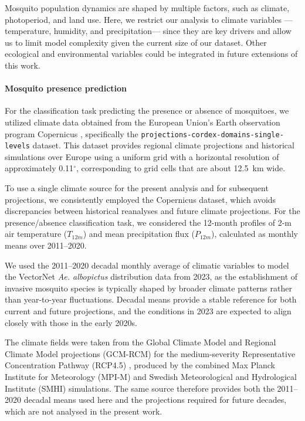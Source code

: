 \documentclass[preprint,12pt]{elsarticle}
\begin{document}
Mosquito population dynamics are shaped by multiple factors, such as climate, photoperiod, and land use. Here, we restrict our analysis to climate variables —temperature, humidity, and precipitation— since they are key drivers \cite{zardini2024, Steindorf2025} and allow us to limit model complexity given the current size of our dataset. Other ecological and environmental variables could be integrated in future extensions of this work.

\paragraph{Mosquito presence prediction}

For the classification task predicting the presence or absence of mosquitoes, we utilized climate data obtained from the European Union's Earth observation program Copernicus \cite{copernicus_2025}, specifically the \texttt{projections-cordex-domains-single-levels} dataset. 
This dataset provides regional climate projections and historical simulations over Europe using a uniform grid with a horizontal resolution of approximately 0.11$^\circ$, corresponding to grid cells that are about 12.5~km wide.

To use a single climate source for the present analysis and for subsequent projections, we consistently employed the Copernicus dataset, which avoids discrepancies between historical reanalyses and future climate projections. For the presence/absence classification task, we considered the 12-month profiles of 2-m air temperature ($T_{12m}$) and mean precipitation flux ($P_{12m}$), calculated as monthly means over 2011--2020.

We used the 2011–2020 decadal monthly average of climatic variables to model the VectorNet \emph{Ae. albopictus} distribution data from 2023, as the establishment of invasive mosquito species is typically shaped by broader climate patterns rather than year-to-year fluctuations. Decadal means provide a stable reference for both current and future projections, and the conditions in 2023 are expected to align closely with those in the early 2020s.


The climate fields were taken from the Global Climate Model and Regional Climate Model projections (GCM-RCM) for the medium-severity Representative Concentration Pathway (RCP4.5) \cite{vanVuuren2011}, produced by the combined Max Planck Institute for Meteorology (MPI-M) and Swedish Meteorological and Hydrological Institute (SMHI) simulations. The same source therefore provides both the 2011--2020 decadal means used here and the projections required for future decades, which are not analysed in the present work.
\end{document}
